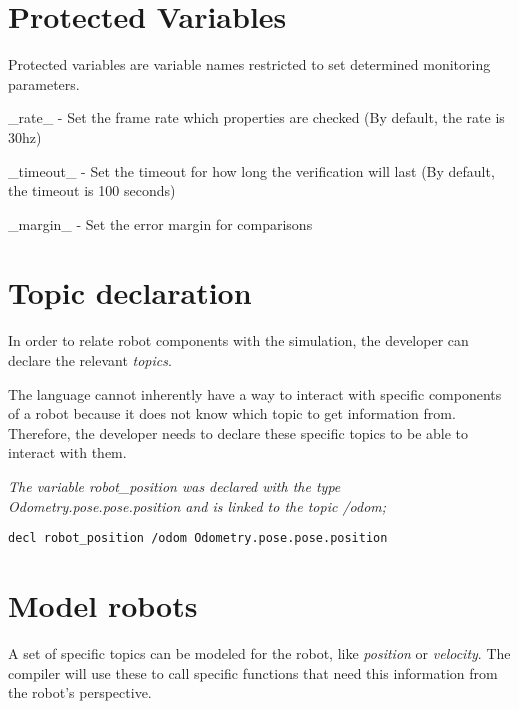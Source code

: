 \section{Protected Variables}

Protected variables are variable names restricted to set determined monitoring parameters.

\_rate\_ - Set the frame rate which properties are checked (By default, the rate is 30hz)

\_timeout\_ - Set the timeout for how long the verification will last (By default, the timeout is 100 seconds)

\_margin\_ - Set the error margin for comparisons

\section{Topic declaration}

In order to relate robot components with the simulation, the developer can declare the relevant \textit{topics}.

The language cannot inherently have a way to interact with specific components of a robot because it does not know which topic to get information from. Therefore, the developer needs to declare these specific topics to be able to interact with them.

\textit{The variable robot\_position was declared with the type Odometry.pose.pose.position and is linked to the topic /odom;}


\texttt{decl robot\_position /odom Odometry.pose.pose.position}

\section{Model robots}

A set of specific topics can be modeled for the robot, like \textit{position} or \textit{velocity}. The compiler will use these to call specific functions that need this information from the robot's perspective.


